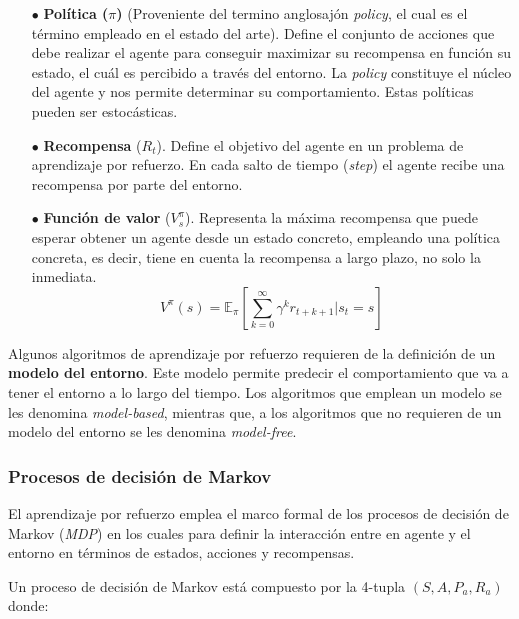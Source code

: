 \begin{itemize}
	\item[$\bullet$] \textbf{Política ($\pi$)}  (Proveniente del termino anglosajón \textit{policy}, el cual es el término empleado en el estado del arte). Define el conjunto de acciones que debe realizar el agente para conseguir maximizar su recompensa en función su estado, el cuál es percibido a través del entorno. La \textit{policy} constituye el núcleo del agente y nos permite determinar su comportamiento. Estas políticas pueden ser estocásticas.
	
	\item[$\bullet$] \textbf{Recompensa} ($R_t$). 
	Define el objetivo del agente en un problema de aprendizaje por refuerzo. En cada salto de tiempo (\textit{step}) el agente recibe una recompensa por parte del entorno. 
	
	\item[$\bullet$] \textbf{Función de valor} ($V^\pi_s$). Representa la máxima recompensa que puede esperar obtener un agente desde un estado concreto, empleando una política concreta, es decir, tiene en cuenta la recompensa a largo plazo, no solo la inmediata.
	\begin{equation}
		V^\pi(s)= \mathbb{E}_\pi\left[\sum_{k=0}^{\infty}{\gamma^k r_{t+k+1}}\Big|s_t=s\right]
	\end{equation}
		
\end{itemize}
Algunos algoritmos de aprendizaje por refuerzo requieren de la definición de un \textbf{modelo del entorno}. Este modelo permite predecir el comportamiento que va a tener el entorno a lo largo del tiempo. Los algoritmos que emplean un modelo se les denomina \textit{model-based}, mientras que, a los algoritmos que no requieren de un modelo del entorno se les denomina \textit{model-free}.

\subsubsection{Procesos de decisión de Markov}

El aprendizaje por refuerzo emplea el marco formal de los procesos de decisión de Markov (\textit{MDP}) en los cuales para definir la interacción entre en agente y el entorno en términos de estados, acciones y recompensas.

Un proceso de decisión de Markov está compuesto por la 4-tupla $(S,A,P_a,R_a)$ donde:

